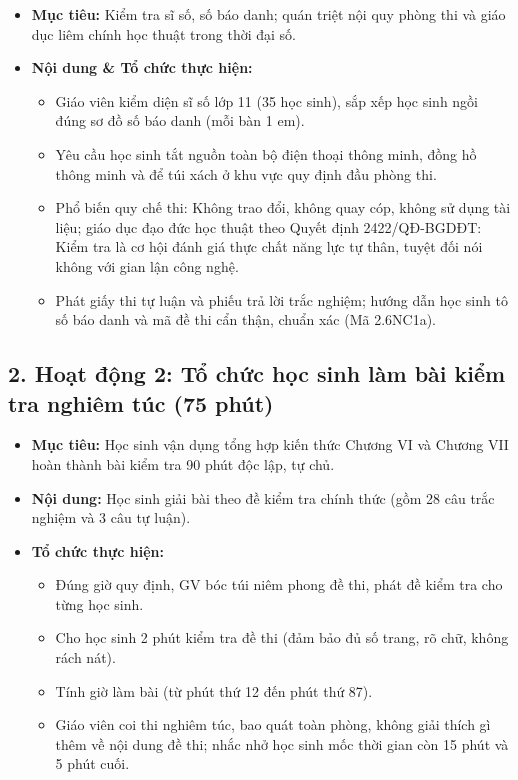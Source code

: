 \documentclass[12pt, a4paper]{article}
\begin{document}
\begin{itemize}[leftmargin=1.2cm]
    \item[a)] \textbf{Mục tiêu:} Kiểm tra sĩ số, số báo danh; quán triệt nội quy phòng thi và giáo dục liêm chính học thuật trong thời đại số.
    \item[b)] \textbf{Nội dung & Tổ chức thực hiện:}
    \begin{itemize}[leftmargin=0.6cm]
        \item Giáo viên kiểm diện sĩ số lớp 11 (35 học sinh), sắp xếp học sinh ngồi đúng sơ đồ số báo danh (mỗi bàn 1 em).
        \item Yêu cầu học sinh tắt nguồn toàn bộ điện thoại thông minh, đồng hồ thông minh và để túi xách ở khu vực quy định đầu phòng thi.
        \item Phổ biến quy chế thi: Không trao đổi, không quay cóp, không sử dụng tài liệu; giáo dục đạo đức học thuật theo Quyết định 2422/QĐ-BGDĐT: Kiểm tra là cơ hội đánh giá thực chất năng lực tự thân, tuyệt đối nói không với gian lận công nghệ.
        \item Phát giấy thi tự luận và phiếu trả lời trắc nghiệm; hướng dẫn học sinh tô số báo danh và mã đề thi cẩn thận, chuẩn xác (Mã 2.6NC1a).
    \end{itemize}
\end{itemize}

\subsection*{2. Hoạt động 2: Tổ chức học sinh làm bài kiểm tra nghiêm túc (75 phút)}

\begin{itemize}[leftmargin=1.2cm]
    \item[a)] \textbf{Mục tiêu:} Học sinh vận dụng tổng hợp kiến thức Chương VI và Chương VII hoàn thành bài kiểm tra 90 phút độc lập, tự chủ.
    \item[b)] \textbf{Nội dung:} Học sinh giải bài theo đề kiểm tra chính thức (gồm 28 câu trắc nghiệm và 3 câu tự luận).
    \item[c)] \textbf{Tổ chức thực hiện:}
    \begin{itemize}[leftmargin=0.6cm]
        \item Đúng giờ quy định, GV bóc túi niêm phong đề thi, phát đề kiểm tra cho từng học sinh.
        \item Cho học sinh 2 phút kiểm tra đề thi (đảm bảo đủ số trang, rõ chữ, không rách nát).
        \item Tính giờ làm bài (từ phút thứ 12 đến phút thứ 87).
        \item Giáo viên coi thi nghiêm túc, bao quát toàn phòng, không giải thích gì thêm về nội dung đề thi; nhắc nhở học sinh mốc thời gian còn 15 phút và 5 phút cuối.
    \end{itemize}
\end{itemize}
\end{document}
